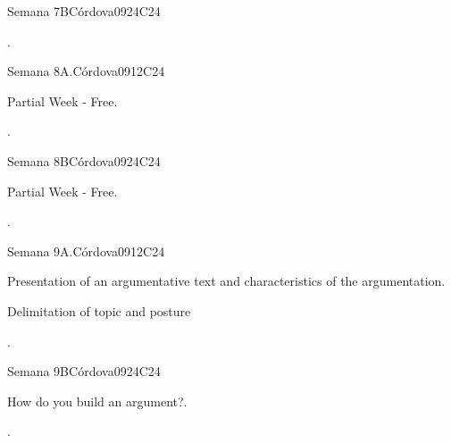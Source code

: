 \begin{syllabus}
\begin{unit}{Semana 7B}{}{Córdova09}{24}{C24}
   \begin{learningoutcomes}
      \item . 
      \end{learningoutcomes}
\end{unit}


\begin{unit}{Semana 8A.}{}{Córdova09}{12}{C24}
   \begin{topics}
      \item Partial Week - Free.
   \end{topics}
   \begin{learningoutcomes}
      \item .
   \end{learningoutcomes}
\end{unit}

\begin{unit}{Semana 8B}{}{Córdova09}{24}{C24}
   \begin{topics}
      \item Partial Week - Free.
   \end{topics}

   \begin{learningoutcomes}
      \item .
      \end{learningoutcomes}
\end{unit}


\begin{unit}{Semana 9A.}{}{Córdova09}{12}{C24}
   \begin{topics}
      \item Presentation of an argumentative text and characteristics of the argumentation.
      \item Delimitation of topic and posture

   \end{topics}
   \begin{learningoutcomes}
      \item .
   \end{learningoutcomes}
\end{unit}

\begin{unit}{Semana 9B}{}{Córdova09}{24}{C24}
   \begin{topics}
      \item How do you build an argument?.
   \end{topics}

   \begin{learningoutcomes}
      \item .
      \end{learningoutcomes}
\end{unit}



\end{syllabus}
